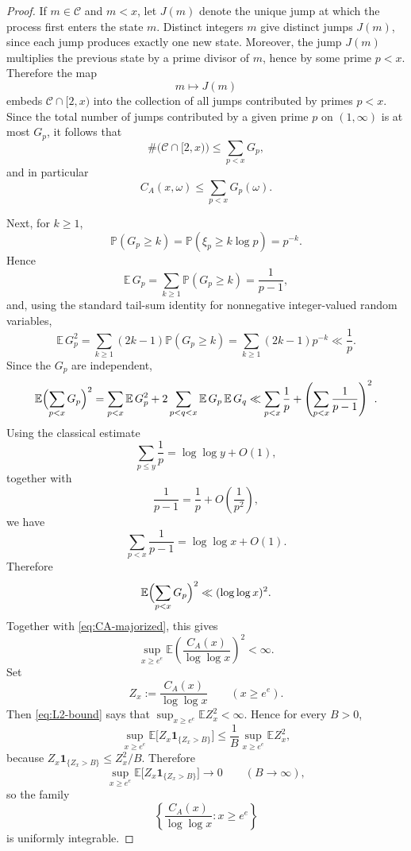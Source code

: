 \documentclass[11pt,letterpaper,reqno]{amsart}
\theoremstyle{definition}
\numberwithin{equation}{section}
\newcommand{\1}{\mathbf 1}
\begin{document}
\begin{proof}
If \(m\in\mathcal C\) and \(m<x\), let \(J(m)\) denote the unique jump at which the process first enters the state \(m\). Distinct integers \(m\) give distinct jumps \(J(m)\), since each jump produces exactly one new state. Moreover, the jump \(J(m)\) multiplies the previous state by a prime divisor of \(m\), hence by some prime \(p<x\). Therefore the map
\[
m\mapsto J(m)
\]
embeds \(\mathcal C\cap [2,x)\) into the collection of all jumps contributed by primes \(p<x\). Since the total number of jumps contributed by a given prime \(p\) on \((1,\infty)\) is at most \(G_p\), it follows that
\[
\#\bigl(\mathcal C\cap [2,x)\bigr)\le \sum_{p<x}G_p,
\]
and in particular
\begin{equation}\label{eq:CA-majorized}
C_A(x,\omega)\le \sum_{p<x}G_p(\omega).
\end{equation}

Next, for $k\ge 1$,
\[
\mathbb P(G_p\ge k)=\mathbb P(\xi_p\ge k\log p)=p^{-k}.
\]
Hence
\[
\mathbb E\,G_p=\sum_{k\ge 1}\mathbb P(G_p\ge k)=\frac{1}{p-1},
\]
and, using the standard tail-sum identity for nonnegative integer-valued random variables,
\[
\mathbb E\,G_p^2
=
\sum_{k\ge 1}(2k-1)\mathbb P(G_p\ge k)
=
\sum_{k\ge 1}(2k-1)p^{-k}
\ll \frac{1}{p}.
\]
Since the $G_p$ are independent,
\[
\mathbb E\Bigl(\sum_{p<x}G_p\Bigr)^2
=
\sum_{p<x}\mathbb E\,G_p^2
+
2\sum_{\substack{p<q<x}}\mathbb E\,G_p\,\mathbb E\,G_q
\ll
\sum_{p<x}\frac1p
+
\left(\sum_{p<x}\frac1{p-1}\right)^2.
\]
Using the classical estimate
\[
\sum_{p\le y}\frac1p=\log\log y+O(1),
\]
together with
\[
\frac1{p-1}=\frac1p+O\!\left(\frac1{p^2}\right),
\]
we have
\[
\sum_{p<x}\frac1{p-1}=\log\log x+O(1).
\]
Therefore
\[
\mathbb E\Bigl(\sum_{p<x}G_p\Bigr)^2\ll (\log\log x)^2.
\]
Together with \eqref{eq:CA-majorized}, this gives
\begin{equation}\label{eq:L2-bound}
\sup_{x\ge e^e}\mathbb E\left(\frac{C_A(x)}{\log\log x}\right)^2<\infty.
\end{equation}
Set
\[
Z_x:=\frac{C_A(x)}{\log\log x}\qquad (x\ge e^e).
\]
Then \eqref{eq:L2-bound} says that \(\sup_{x\ge e^e}\mathbb E Z_x^2<\infty\).
Hence for every \(B>0\),
\[
\sup_{x\ge e^e}\mathbb E\bigl[Z_x\mathbf 1_{\{Z_x>B\}}\bigr]
\le
\frac1B\sup_{x\ge e^e}\mathbb E Z_x^2,
\]
because \(Z_x\mathbf 1_{\{Z_x>B\}}\le Z_x^2/B\).
Therefore
\[
\sup_{x\ge e^e}\mathbb E\bigl[Z_x\mathbf 1_{\{Z_x>B\}}\bigr]\to 0
\qquad (B\to\infty),
\]
so the family
\[
\left\{\frac{C_A(x)}{\log\log x}: x\ge e^e\right\}
\]
is uniformly integrable.

\medskip


\end{proof}
\end{document}
